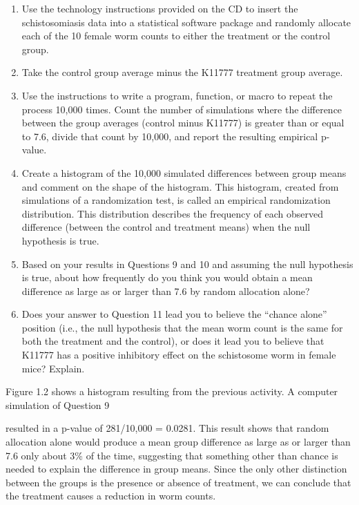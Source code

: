\documentclass[
]{report}
\theoremstyle{definition}
\theoremstyle{definition}
\theoremstyle{definition}
\theoremstyle{definition}
\theoremstyle{remark}
\begin{document}
\begin{enumerate}
\def\labelenumi{\arabic{enumi}.}
\setcounter{enumi}{6}
\item
  Use the technology instructions provided on the CD to insert the schistosomiasis data into a statistical
  software package and randomly allocate each of the 10 female worm counts to either the treatment or the
  control group.
\item
  Take the control group average minus the K11777 treatment group average.
\item
  Use the instructions to write a program, function, or macro to repeat the process 10,000 times. Count
  the number of simulations where the difference between the group averages (control minus K11777) is
  greater than or equal to 7.6, divide that count by 10,000, and report the resulting empirical p-value.
\item
  Create a histogram of the 10,000 simulated differences between group means and comment on the
  shape of the histogram. This histogram, created from simulations of a randomization test, is called an
  empirical randomization distribution. This distribution describes the frequency of each observed
  difference (between the control and treatment means) when the null hypothesis is true.
\item
  Based on your results in Questions 9 and 10 and assuming the null hypothesis is true, about how frequently
  do you think you would obtain a mean difference as large as or larger than 7.6 by random allocation alone?
\item
  Does your answer to Question 11 lead you to believe the ``chance alone'' position (i.e., the null hypothesis
  that the mean worm count is the same for both the treatment and the control), or does it lead you to
  believe that K11777 has a positive inhibitory effect on the schistosome worm in female mice? Explain.
\end{enumerate}

Figure 1.2 shows a histogram resulting from the previous activity. A computer simulation of Question 9

resulted in a p-value of 281/10,000 = 0.0281. This result shows that random allocation alone would produce
a mean group difference as large as or larger than 7.6 only about 3\% of the time, suggesting that something
other than chance is needed to explain the difference in group means. Since the only other distinction between
the groups is the presence or absence of treatment, we can conclude that the treatment causes a reduction in
worm counts.
\end{document}
